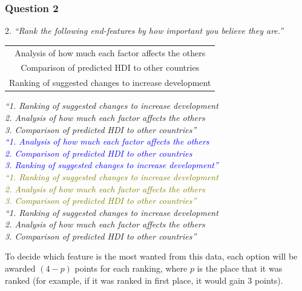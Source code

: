 \documentclass[12pt]{report}
\begin{document}
\subsubsection{Question 2}
2. \textit{``Rank the following end-features by how important you believe they are.''}
\begin{center}
\begin{tabular}{c}
    Analysis of how much each factor affects the others \\
    Comparison of predicted HDI to other countries \\
    Ranking of suggested changes to increase development
\end{tabular}
\end{center}
\begin{flushright}
\textit{\textcolor{Sepia}{``1. Ranking of suggested changes to increase development \\ 2. Analysis of how much each factor affects the others \\ 3. Comparison of predicted HDI to other countries''}} \\
\textit{\textcolor{Blue}{``1. Analysis of how much each factor affects the others \\ 2. Comparison of predicted HDI to other countries \\ 3. Ranking of suggested changes to increase development''}} \\
\textit{\textcolor{olive}{``1. Ranking of suggested changes to increase development \\ 2. Analysis of how much each factor affects the others \\ 3. Comparison of predicted HDI to other countries''}} \\
\textit{\textcolor{OliveGreen}{``1. Ranking of suggested changes to increase development \\ 2. Analysis of how much each factor affects the others \\ 3. Comparison of predicted HDI to other countries''}}
\end{flushright}
To decide which feature is the most wanted from this data, each option will be awarded $\left(4-p\right)$ points for each ranking, where $p$ is the place that it was ranked (for example, if it was ranked in first place, it would gain 3 points).
\endfeaturedata
\end{document}
